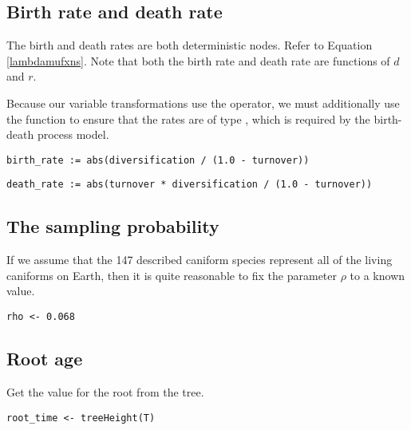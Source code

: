 \subsection{Birth rate and death rate}

The birth and death rates are both deterministic nodes. 
Refer to Equation \ref{lambdamufxns}. Note that both the birth rate and death rate are functions of $d$ and $r$.

Because our variable transformations use the \cl{-} operator, we must additionally use the  function to ensure that the rates are of type , which is required by the birth-death process model.
{\tt \begin{snugshade*}
\begin{lstlisting}
birth_rate := abs(diversification / (1.0 - turnover))
\end{lstlisting}
\end{snugshade*}}

{\tt \begin{snugshade*}
\begin{lstlisting}
death_rate := abs(turnover * diversification / (1.0 - turnover))
\end{lstlisting}
\end{snugshade*}}

\subsection{The sampling probability}

If we assume that the 147 described caniform species represent all of the living caniforms on Earth, then it is quite reasonable to fix the parameter $\rho$ to a known value.
{\tt \begin{snugshade*}
\begin{lstlisting}
rho <- 0.068
\end{lstlisting}
\end{snugshade*}}

\subsection{Root age}

Get the value for the root from the \citet{dosReis2012} tree.

{\tt \begin{snugshade*}
\begin{lstlisting}
root_time <- treeHeight(T)
\end{lstlisting}
\end{snugshade*}}

